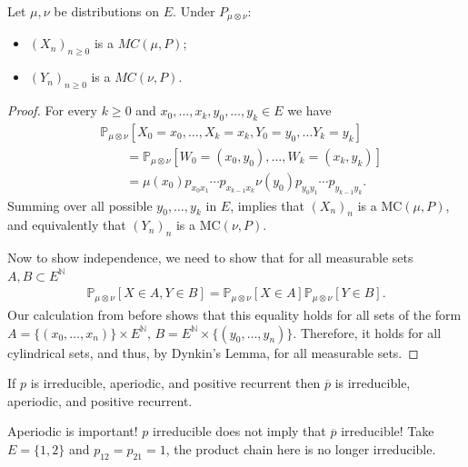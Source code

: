 \begin{prop}[]
	Let $\mu,\nu $ be distributions on $E$. Under $P_{\mu \otimes \nu }:$ 
\begin{itemize}
	\item $(X_n)_{n\geq 0}$ is a $MC(\mu ,P)$;
	\item $(Y_n)_{n\geq 0}$ is a $MC(\nu ,P)$.
\end{itemize}
\end{prop}
\begin{proof}
	For every $k\geq 0$ and $x_0,\ldots,x_k, y_0, \ldots, y_k \in E$ we have
\begin{align}
&	\mathbb{P}_{\mu \otimes \nu } \left[ X_0 = x_0, \ldots, X_k=x_k, Y_0 = y_0, \ldots Y_k = y_k \right] \\
&\qquad= \mathbb{P}_{\mu \otimes \nu } \left[ W_0=(x_0, y_0), \ldots, W_k = (x_k, y_k) \right] \\
&\qquad= \mu (x_0) p_{x_0x_1}\cdots p_{x_{k-1}x_k} \nu (y_0) p_{y_0 y_1} \cdots p_{y_{k-1}y_k}
.	\end{align}
Summing over all possible $y_0,\ldots , y_k$ in $E$, implies that $(X_n)_{n}$ is a MC$(\mu ,P)$, and equivalently that $(Y_n)_{n}$ is a MC$(\nu ,P)$.	

Now to show independence, we need to show that for all measurable sets $A,B \subset E^{\mathbb{N}}$ 
\begin{align}
	\mathbb{P}_{\mu \otimes \nu } \left[ X \in A, Y\in B \right] = \mathbb{P}_{\mu \otimes \nu } \left[ X \in A \right] \mathbb{P}_{\mu \otimes \nu } \left[ Y \in B \right].
\end{align}
Our calculation from before shows that this equality holds for all sets of the form $A = \{(x_0,\ldots,x_n)\} \times E^{\mathbb{N}}$, $B=E^{\mathbb{N}}\times \{(y_0,\ldots , y_n)\}$. Therefore, it holds for all cylindrical sets, and thus, by Dynkin's Lemma, for all measurable sets.
\end{proof}

\begin{prop}[]
	If $p$ is irreducible, aperiodic, and positive recurrent then $\overline{p}$ is irreducible, aperiodic, and positive recurrent.
\end{prop}


\begin{rmk}[]
	Aperiodic is important!  $p$ irreducible does not imply that $\overline{p}$ irreducible! Take $E = \{1,2\}$ and $p_{12} = p_{21}=1$, the product chain here is no longer irreducible.
\end{rmk}

